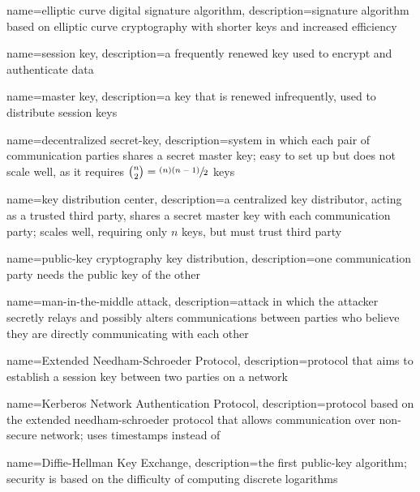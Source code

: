 {
    name={elliptic curve digital signature algorithm},
    description={signature algorithm based on elliptic curve cryptography with shorter keys and increased efficiency}
}

{
    name={session key},
    description={a frequently renewed key used to encrypt and authenticate data}
}

{
    name={master key},
    description={a key that is renewed infrequently, used to distribute \glspl{session key}}
}

{
    name={decentralized secret-key},
    description={system in which each pair of communication parties shares a secret \gls{master key}; easy to set up but does not scale well, as it requires $\binom{n}{2}=\sfrac{(n)(n-1)}{2}$ keys}
}

{
    name={key distribution center},
    description={a centralized key distributor, acting as a trusted third party, shares a secret \gls{master key} with each communication party; scales well, requiring only $n$ keys, but must trust third party}
}

{
    name={public-key cryptography key distribution},
    description={one communication party needs the public key of the other}
}

{
    name={man-in-the-middle attack},
    description={attack in which the attacker secretly relays and possibly alters communications between parties who believe they are directly communicating with each other}
}

{
    name={Extended Needham-Schroeder Protocol},
    description={protocol that aims to establish a \gls{session key} between two parties on a network}
}

{
    name={Kerberos Network Authentication Protocol},
    description={protocol based on the \gls{extended needham-schroeder protocol} that allows communication over non-secure network; uses timestamps instead of }
}

{
    name={Diffie-Hellman Key Exchange},
    description={the first public-key algorithm; security is based on the difficulty of computing discrete logarithms}
}


